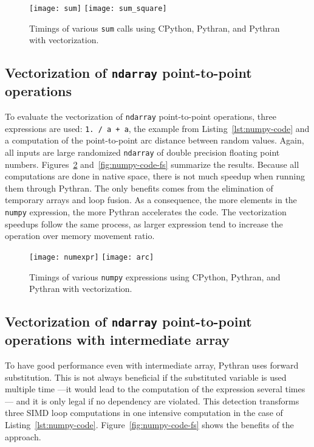 \documentclass[10pt]{sigplanconf}
\begin{document}
\begin{figure}[ht]

    \texttt{[image: sum]}
    \texttt{[image: sum\_square]}
    \caption{Timings of various \texttt{sum} calls using CPython, Pythran, and Pythran with vectorization.}
    \label{fig:sum-timings}

\end{figure}

\subsection{Vectorization of \texttt{ndarray} point-to-point operations}
\label{sec:bench-numpy}

To evaluate the vectorization of \texttt{ndarray} point-to-point operations,
three expressions are used: \texttt{1. / a + a}, the example from
Listing~\ref{lst:numpy-code} and a computation of the point-to-point arc
distance  between random values. Again, all inputs are large randomized
\texttt{ndarray} of double precision floating point numbers.
Figures~\ref{fig:numpy-timings} and~\ref{fig:numpy-code-fs} summarize the
results. Because all computations are done in native space, there is not much
speedup when running them through Pythran. The only benefits comes from the
elimination of temporary arrays and loop fusion. As a consequence, the more
elements in the \texttt{numpy} expression, the more Pythran accelerates the
code. The vectorization speedups follow the same process, as larger expression
tend to increase the operation over memory movement ratio.

\begin{figure}[ht]

    \texttt{[image: numexpr]}
    \texttt{[image: arc]}
    \caption{Timings of various \texttt{numpy} expressions using CPython, Pythran, and Pythran with vectorization.}
    \label{fig:numpy-timings}

\end{figure}

\subsection{Vectorization of \texttt{ndarray} point-to-point operations with
intermediate array}

To have good performance even with intermediate array, Pythran uses forward
substitution. This is not always beneficial if the substituted variable is used multiple time ---it
would lead to the computation of the expression several times--- and it is only legal if no dependency are violated. This detection
transforms three SIMD loop computations in one intensive computation in the case of Listing~\ref{lst:numpy-code}. Figure~\ref{fig:numpy-code-fs} shows the benefits of the approach.
\end{document}
